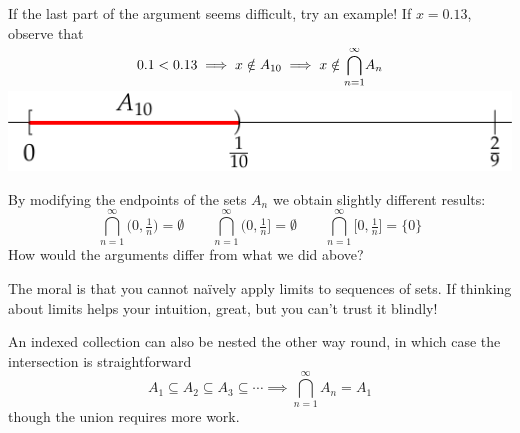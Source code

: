 \begin{example}{}{}
	If the last part of the argument seems difficult, try an example! If $x=0.13$, observe that\par
	\begin{minipage}[t]{0.6\linewidth}\vspace{-10pt}
		\[
			0.1<0.13 \implies x\notin A_{10} \implies x\notin\smash{\bigcap\limits_{n=1}^\infty} A_n
		\]
	\end{minipage}
	\hfill
	\begin{minipage}[t]{0.3\linewidth}\vspace{3pt}
		\hfill \includegraphics{setsii-06-intervalex}
	\end{minipage}
	\medbreak

	By modifying the endpoints of the sets $A_n$ we obtain slightly different results:
	\[
		\bigcap_{n=1}^\infty \bigl(0,\tfrac 1n) =\emptyset \qquad \bigcap_{n=1}^\infty \bigl(0,\tfrac 1n] =\emptyset\qquad \bigcap_{n=1}^\infty \bigl[0,\tfrac 1n] =\{0\}
	\]
	How would the arguments differ from what we did above?
\end{example}




The moral is that you cannot naïvely apply limits to sequences of sets. If thinking about limits helps your intuition, great, but you can't trust it blindly!\bigbreak

An indexed collection can also be nested the other way round, in which case the intersection is straightforward
\[
	A_1\subseteq A_2\subseteq A_3\subseteq\cdots \implies {\bigcap_{n=1}^\infty} A_n=A_1
\]
though the union requires more work.

